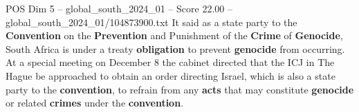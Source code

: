 \begin{textsample}{POS Dim 5 – global\_south\_2024\_01 – Score 22.00 – global\_south\_2024\_01/104873900.txt}
It said as a state party to the \textbf{Convention} on the \textbf{Prevention} and Punishment of the \textbf{Crime} of \textbf{Genocide}, South Africa is under a treaty \textbf{obligation} to prevent \textbf{genocide} from occurring.
At a special meeting on December 8 the cabinet directed that the ICJ in The Hague be approached to obtain an order directing Israel, which is also a state party to the \textbf{convention}, to refrain from any \textbf{acts} that may constitute \textbf{genocide} or related \textbf{crimes} under the \textbf{convention}.

\end{textsample}
